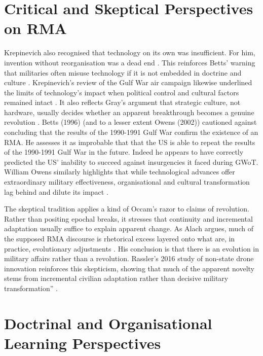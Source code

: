 \section{Critical and Skeptical Perspectives on RMA}

Krepinevich also recognised that technology on its own was insufficient. For him, invention without reorganisation was a dead end \parencite{KREP_1992}. This reinforces Betts’ warning that militaries often misuse technology if it is not embedded in doctrine and culture \parencite{BETTS_1996}. Krepinevich’s review of the Gulf War air campaign likewise underlined the limits of technology’s impact when political control and cultural factors remained intact \parencite{KREP_1996}. It also reflects Gray’s argument that strategic culture, not hardware, usually decides whether an apparent breakthrough becomes a genuine revolution \parencite{GRAY_2005}. Betts (1996) (and to a lesser extent Owens (2002)\nocite{OWENS_2002}) cautioned against concluding that the results of the 1990-1991 Gulf War confirm the existence of an RMA. He assesses it as improbable that that the US is able to repeat the results of the 1990-1991 Gulf War in the future. Indeed he appears to have correctly predicted the US' inability to succeed against insurgencies it faced during GWoT. William Owens  similarly highlights that while technological advances offer extraordinary military effectiveness, organisational and cultural transformation lag behind and dilute its impact \parencite{OWENS_2002}. 

The skeptical tradition applies a kind of Occam’s razor to claims of revolution. Rather than positing epochal breaks, it stresses that continuity and incremental adaptation usually suffice to explain apparent change. As Alach argues, much of the supposed RMA discourse is rhetorical excess layered onto what are, in practice, evolutionary adjustments \parencite[.p~50-52]{ALACH_2008}. His conclusion is that there is an evolution in military affairs rather than a revolution. Rassler’s 2016 study of non-state drone innovation reinforces this skepticism, showing that much of the apparent novelty stems from incremental civilian adaptation rather than decisive military transformation”  \parencite{RASSLER_2016}.

\section{Doctrinal and Organisational Learning Perspectives}

